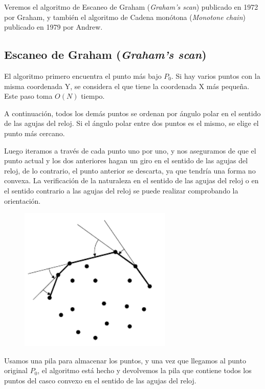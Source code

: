 Veremos el algoritmo de Escaneo de Graham (\emph{Graham's scan}) publicado en 1972 por Graham, y también el algoritmo de Cadena monótona (\emph{Monotone chain}) publicado en 1979 por Andrew.

\subsection{Escaneo de Graham (\emph{Graham's scan})}

El algoritmo primero encuentra el punto más bajo $P_0$. Si hay varios puntos con la misma coordenada Y, se considera el que tiene la coordenada X más pequeña. Este paso toma $O(N)$ tiempo.

A continuación, todos los demás puntos se ordenan por ángulo polar en el sentido de las agujas del reloj. Si el ángulo polar entre dos puntos es el mismo, se elige el punto más cercano.

Luego iteramos a través de cada punto uno por uno, y nos aseguramos de que el punto actual y los dos anteriores hagan un giro en el sentido de las agujas del reloj, de lo contrario, el punto anterior se descarta, ya que tendría una forma no convexa. La verificación de la naturaleza en el sentido de las agujas del reloj o en el sentido contrario a las agujas del reloj se puede realizar comprobando la orientación.

\begin{figure}[!h]
	\centering
	\includegraphics[scale=0.35]{img/cubierta_convexa4}
	\label{fig:cubiertaconvexa2}
\end{figure}

Usamos una pila para almacenar los puntos, y una vez que llegamos al punto original $P_0$, el algoritmo está hecho y devolvemos la pila que contiene todos los puntos del casco convexo en el sentido de las agujas del reloj.

